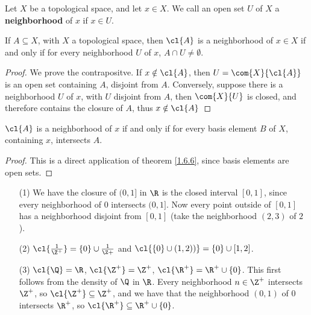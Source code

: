 \begin{definition}
    Let $X$ be a topological space, and let  $x \in X$. We call an open set  $U$
    of  $X$ a \textbf{neighborhood} of  $x$ if  $x \in U$.
\end{definition}

\begin{theorem}\label{1.6.6}
    If $A \subseteq X$, with  $X$ a topological space, then  $\cl{A}$ is a
    neighborhood of  $x \in X$ if and only if for every neighborhood  $U$ of
    $x$,  $A \cap U \neq \emptyset$.
\end{theorem}
\begin{proof}
    We prove the contrapositve. If $x \notin \cl{A}$, then
    $U=\com{X}{\cl{A}}$ is an open set containing  $A$, disjoint from
    $A$. Conversely, suppose there is a neighborhood $U$ of $x$, with $U$
    disjoint from  $A$, then  $\com{X}{U}$ is closed, and therefore contains the
    closure of  $A$, thus  $x \notin \cl{A}$
\end{proof}
\begin{corollary}
    $\cl{A}$ is a neighborhood of  $x$ if and only if for every basis element
    $B$ of  $X$, containing  $x$, intersects  $A$.
\end{corollary}
\begin{proof}
    This is a direct application of theorem \ref{1.6.6}, since basis elements
    are open sets.
\end{proof}

\begin{example}
    \begin{enumerate}
        \item[(1)] We have the closure of $(0,1]$ in  $\R$ is the closed interval
            $[0,1]$, since every neighborhood of $0$ intersects  $(0,1]$. Now
            every point outside of  $[0,1]$ has a neighborhood disjoint from
            $[0,1]$  (take the neighborhood $(2,3)$ of  $2$).

        \item[(2)] $\cl{\frac{1}{\Z^+}}=\{0\} \cup \frac{1}{\Z+}$ and $\cl{\{0\} \cup
            (1,2))}=\{0\} \cup [1,2]$.

        \item[(3)] $\cl{\Q}=\R$,  $\cl{\Z^+}=\Z^+$,  $\cl{\R^+}=\R^+ \cup \{0\}$.
            This first follows from the density of $\Q$ in  $\R$. Every
            neighborhood  $n \in \Z^+$ intersects  $\Z^+$, so  $\cl{\Z^+}
            \subseteq \Z^+$, and we have that the neighborhood  $(0,1)$ of  $0$
            intersects $\R^+$, so  $\cl{\R^+} \subseteq \R^+ \cup \{0\}$.
    \end{enumerate}
\end{example}

